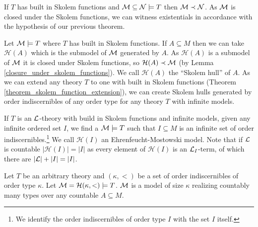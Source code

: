 \begin{lemma}\label{closure_under_skolem_functions}
If \(T\) has built in Skolem functions and \(\mathcal{M} \subseteq \mathcal{N} \models T\) then \(\mathcal{M} \prec \mathcal{N}\). 
As \(\mathcal{M}\) is closed under the Skolem functions, we can witness existentials in accordance with the hypothesis of our previous theorem. 
\end{lemma}

\begin{definition}\label{definition_skolem_hull}
Let \(\mathcal{M} \models T\) where \(T\) has built in Skolem functions. 
If \(A \subseteq M\) then we can take \(\mathcal{H}(A)\) which is the submodel of \(\mathcal{M}\) generated by \(A\).
As \(\mathcal{H}(A)\) is a submodel of \(\mathcal{M}\) it is closed under Skolem functions, so \(\mathcal{H}(A) \prec \mathcal{M}\) (by Lemma \ref{closure_under_skolem_functions}).
We call \(\mathcal{H}(A)\) the ``Skolem hull'' of \(A\). As we can extend any theory \(T\) to one with built in Skolem functions (Theorem \ref{theorem_skolem_function_extension}), we can create Skolem hulls generated by order indiscernibles of any order type for any theory \(T\) with infinite models.
\end{definition}

\begin{definition}\label{definition_ehrenfeuct_mostowski_model}
If \(T\) is an \(\mathcal{L}\)-theory with build in Skolem functions and infinite models, given any infinite ordered set \(I\), we find a \(\mathcal{M} \models T\) such that \(I \subseteq M\) is an infinite set of order indiscernibles.\footnote{We identify the order indiscernibles of order type \(I\) with the set \(I\) itself.}
We call \(\mathcal{H}(I)\) an Ehrenfeucht-Mostowski model. 
Note that if \(\mathcal{L}\) is countable \(|\mathcal{H}(I)| = |I|\) as every element of \(\mathcal{H}(I)\) is an \(\mathcal{L}_{I}\)-term, of which there are \(|\mathcal{L}|+|I| = |I|\).
\end{definition}

\begin{theorem}\label{theorem_ehrenfeuct_mostowski_types}
Let \(T\) be an arbitrary theory and \((\kappa, <)\) be a set of order indiscernibles of order type \(\kappa\).
Let \(\mathcal{M} = \mathcal{H}(\kappa, <)\models T\). 
\(\mathcal{M}\) is a model of size \(\kappa\) realizing countably many types over any countable \(A \subseteq M\).
\end{theorem}

